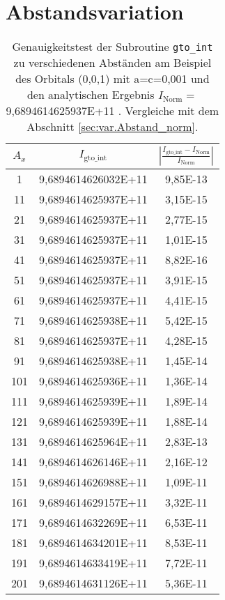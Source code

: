 \chapter{Abstandsvariation}
\label{sec:AnhangC:Tests}
\vspace{-15mm}
\begin{table}[H] \centering \scriptsize
	\caption{Genauigkeitstest der Subroutine 
	\texttt{gto\_int} 
		zu verschiedenen Abständen am Beispiel des Orbitals (0,0,1) mit 
		a=c=0,001 und den analytischen Ergebnis 
		$I_\text{Norm}=$9,6894614625937E+11 . Vergleiche mit dem Abschnitt 
		\ref{sec:var.Abstand_norm}.
		} \vspace{0.2cm}
	\begin{threeparttable} 
		\begin{tabular}{c||c||c}
			$A_x$&  $I_\text{gto\_int}$      
			&$\left|\frac{I_\text{gto\_int}-I_\text{Norm}}{I_\text{Norm}}\right|$
			\\ \hline\hline
1   & 9,6894614626032E+11 & 9,85E-13 \\
11  & 9,6894614625937E+11 & 3,15E-15 \\
21  & 9,6894614625937E+11 & 2,77E-15 \\
31  & 9,6894614625937E+11 & 1,01E-15 \\
41  & 9,6894614625937E+11 & 8,82E-16 \\
51  & 9,6894614625937E+11 & 3,91E-15 \\
61  & 9,6894614625937E+11 & 4,41E-15 \\
71  & 9,6894614625938E+11 & 5,42E-15 \\
81  & 9,6894614625937E+11 & 4,28E-15 \\
91  & 9,6894614625938E+11 & 1,45E-14 \\
101 & 9,6894614625936E+11 & 1,36E-14 \\
111 & 9,6894614625939E+11 & 1,89E-14 \\
121 & 9,6894614625939E+11 & 1,88E-14 \\
131 & 9,6894614625964E+11 & 2,83E-13 \\
141 & 9,6894614626146E+11 & 2,16E-12 \\
151 & 9,6894614626988E+11 & 1,09E-11 \\
161 & 9,6894614629157E+11 & 3,32E-11 \\
171 & 9,6894614632269E+11 & 6,53E-11 \\
181 & 9,6894614634201E+11 & 8,53E-11 \\
191 & 9,6894614633419E+11 & 7,72E-11 \\
201 & 9,6894614631126E+11 & 5,36E-11 \\

\end{tabular}
\end{threeparttable}
\end{table}
